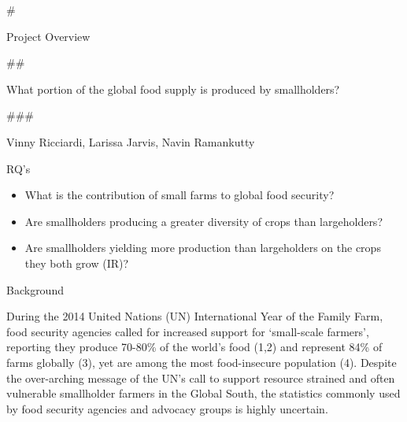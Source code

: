 \documentclass[11pt]{article}
\providecommand{\tightlist}{%
      \setlength{\itemsep}{0pt}\setlength{\parskip}{0pt}}
\begin{document}
    \#

Project Overview

\#\#

What portion of the global food supply is produced by smallholders?

\#\#\#

Vinny Ricciardi, Larissa Jarvis, Navin Ramankutty

    RQ's

\begin{itemize}
\tightlist
\item
  What is the contribution of small farms to global food security?
\item
  Are smallholders producing a greater diversity of crops than
  largeholders?
\item
  Are smallholders yielding more production than largeholders on the
  crops they both grow (IR)?
\end{itemize}

    Background

During the 2014 United Nations (UN) International Year of the Family
Farm, food security agencies called for increased support for
`small-scale farmers', reporting they produce 70-80\% of the world's
food (1,2) and represent 84\% of farms globally (3), yet are among the
most food-insecure population (4). Despite the over-arching message of
the UN's call to support resource strained and often vulnerable
smallholder farmers in the Global South, the statistics commonly used by
food security agencies and advocacy groups is highly uncertain.
\end{document}
